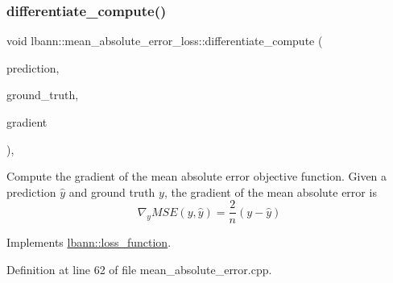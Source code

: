 \subsubsection{\texorpdfstring{differentiate\+\_\+compute()}{differentiate\_compute()}}
{\footnotesize\ttfamily void lbann\+::mean\+\_\+absolute\+\_\+error\+\_\+loss\+::differentiate\+\_\+compute (\begin{DoxyParamCaption}\item[{const \hyperlink{base_8hpp_a9a697a504ae84010e7439ffec862b470}{Abs\+Dist\+Mat} \&}]{prediction,  }\item[{const \hyperlink{base_8hpp_a9a697a504ae84010e7439ffec862b470}{Abs\+Dist\+Mat} \&}]{ground\+\_\+truth,  }\item[{\hyperlink{base_8hpp_a9a697a504ae84010e7439ffec862b470}{Abs\+Dist\+Mat} \&}]{gradient }\end{DoxyParamCaption})\hspace{0.3cm}{\ttfamily [override]}, {\ttfamily [virtual]}}

Compute the gradient of the mean absolute error objective function. Given a prediction $\hat{y}$ and ground truth $y$, the gradient of the mean absolute error is \[ \nabla_y MSE (y,\hat{y}) = \frac{2}{n} (y - \hat{y}) \] 

Implements \hyperlink{classlbann_1_1loss__function_aefccc2b4f5a02664002d12630cf369e7}{lbann\+::loss\+\_\+function}.



Definition at line 62 of file mean\+\_\+absolute\+\_\+error.\+cpp.


